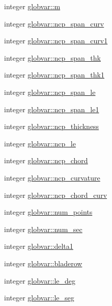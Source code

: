 \begin{DoxyCompactItemize}
integer \hyperlink{namespaceglobvar_ad09e0e97534b13d507e3e376b768ace2}{globvar\+::m}
\item 
integer \hyperlink{namespaceglobvar_a748fd3a637b62037c6e23eb9b0b8b75e}{globvar\+::ncp\+\_\+span\+\_\+curv}
\item 
integer \hyperlink{namespaceglobvar_a93851f6aad4a96c2042f054b33fb2735}{globvar\+::ncp\+\_\+span\+\_\+curv1}
\item 
integer \hyperlink{namespaceglobvar_ac5be283a8db34f8a815db02152694f0e}{globvar\+::ncp\+\_\+span\+\_\+thk}
\item 
integer \hyperlink{namespaceglobvar_aeb3dab07da1184657a2306f02e490440}{globvar\+::ncp\+\_\+span\+\_\+thk1}
\item 
integer \hyperlink{namespaceglobvar_a644232d8ada9b288e16c29d61dbebf0d}{globvar\+::ncp\+\_\+span\+\_\+le}
\item 
integer \hyperlink{namespaceglobvar_a72b833451c2098e8e8b37605581558bd}{globvar\+::ncp\+\_\+span\+\_\+le1}
\item 
integer \hyperlink{namespaceglobvar_a6d8ea5ccd5fef3d661bbfae6de774947}{globvar\+::ncp\+\_\+thickness}
\item 
integer \hyperlink{namespaceglobvar_a092659d30270778769fb935306344024}{globvar\+::ncp\+\_\+le}
\item 
integer \hyperlink{namespaceglobvar_a8f6b996198f130f39452bc1a69c68081}{globvar\+::ncp\+\_\+chord}
\item 
integer \hyperlink{namespaceglobvar_a3dba06f407815715cf5e3ed177d016f0}{globvar\+::ncp\+\_\+curvature}
\item 
integer \hyperlink{namespaceglobvar_a909bbc8bd8371d224674230c41fbe759}{globvar\+::ncp\+\_\+chord\+\_\+curv}
\item 
integer \hyperlink{namespaceglobvar_a32ba7d06170614a028f4f4a10dd42764}{globvar\+::num\+\_\+points}
\item 
integer \hyperlink{namespaceglobvar_a0095cc9c0afc3e8507882537e5702411}{globvar\+::num\+\_\+sec}
\item 
integer \hyperlink{namespaceglobvar_a061aab1c7287a8dc09f346eee4a8bfc5}{globvar\+::delta1}
\item 
integer \hyperlink{namespaceglobvar_ae77b9f21d86127ac705b4176dd89f3e7}{globvar\+::bladerow}
\item 
integer \hyperlink{namespaceglobvar_a2f6ef0024a0f62256df6e067000712be}{globvar\+::le\+\_\+deg}
\item 
integer \hyperlink{namespaceglobvar_af945ae82373f900b43e4b1cad0b4c634}{globvar\+::le\+\_\+seg}
\item 

\end{DoxyCompactItemize}
